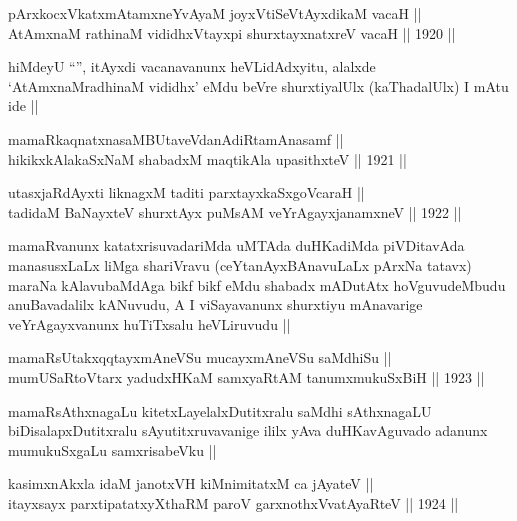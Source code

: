 
\begin{shl}
pArxkocxVkatxmAtamxneYvAyaM joyxVtiSeVtAyxdikaM vacaH || \\
AtAmxnaM rathinaM vididhxVtayxpi shurxtayxnatxreV vacaH ||  1920 ||  
\end{shl}

\begin{artha}
hiMdeyU ``\stext'', itAyxdi vacanavanunx heVLidAdxyitu, alalxde
`AtAmxnaMradhinaM vididhx' eMdu beVre shurxtiyalUlx (kaThadalUlx) I
mAtu ide ||
\end{artha}


\begin{shl}
mamaRkaqnatxnasaMBUtaveVdanAdiRtamAnasamf || \\
hikikxkAlakaSxNaM shabadxM maqtikAla upasithxteV ||  1921 ||  
\end{shl}
				
\begin{shl}
utasxjaRdAyxti liknagxM taditi parxtayxkaSxgoVcaraH ||  \\
tadidaM BaNayxteV shurxtAyx puMsAM veYrAgayxjanamxneV ||  1922 ||  
\end{shl}

\begin{artha}
mamaRvanunx katatxrisuvadariMda uMTAda duHKadiMda piVDitavAda
manasusxLaLx liMga shariVravu (ceYtanAyxBAnavuLaLx pArxNa tatavx)
maraNa kAlavubaMdAga bikf bikf eMdu shabadx mADutAtx hoVguvudeMbudu
anuBavadalilx kANuvudu, A I viSayavanunx shurxtiyu mAnavarige
veYrAgayxvanunx huTiTxsalu heVLiruvudu ||
\end{artha}

\begin{shl}
mamaRsUtakxqqtayxmAneVSu mucayxmAneVSu saMdhiSu || \\
mumUSaRtoV\s tarx yadudxHKaM samxyaRtAM tanumxmukuSxBiH ||  1923 ||  
\end{shl}

\begin{artha}
mamaRsAthxnagaLu kitetxLayelalxDutitxralu saMdhi sAthxnagaLU
biDisalapxDutitxralu sAyutitxruvavanige ililx yAva duHKavAguvado
adanunx mumukuSxgaLu samxrisabeVku ||
\end{artha}

\begin{shl}
kasimxnAkxla idaM janotxVH kiMnimitatxM ca jAyateV ||  \\
itayxsayx parxtipatatxyXthaRM paroV garxnothxV\s vatAyaRteV ||  1924 ||  
\end{shl}

